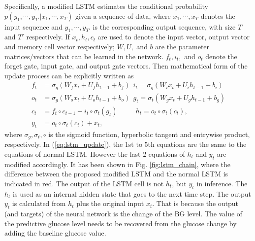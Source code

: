 \documentclass[a4paper, 10 pt, twocolumn]{IEEEtran}
\begin{document}
Specifically,  a modified LSTM estimates the conditional probability $p(y_1, \cdots,y_{T'}|x_1, \cdots,x_{T})$ given a sequence of data, where $x_1, \cdots,x_{T}$ denotes the input sequence and $y_1, \cdots,y_{T'}$ is the
corresponding output sequence, with size $T$ and $T'$ respectively. If $x_t, h_t, c_t$ are used to denote the input vector, output vector and memory cell vector respectively; $W, U,$ and $b$ are the parameter
matrices/vectors that can be learned in the network. $f_t, i_t,$ and $o_t$ denote the forget gate, input gate, and output gate vectors. Then mathematical form of the update process can be explicitly written as
\begin{equation}\label{eq:lstm_update}
\begin{split}
f_t &= \sigma_g(W_fx_t + U_fh_{t-1}+b_f) \ \ i_t = \sigma_g(W_ix_t + U_ih_{t-1}+ b_i)  \\
o_t &= \sigma_g(W_ox_t + U_oh_{t-1}+b_o)  \ \  g_t = \sigma_t(W_gx_t + U_gh_{t-1}+ b_g)  \\
c_t &= f_t \circ c_{t-1} + i_t \circ \sigma_t(g_t)  \ \ \ \ \ \ \ \ \ \ \ \  h_t = o_t \circ \sigma_t(c_t), \\
y_t &= o_t \circ \sigma_t(c_t) + x_t,
\end{split}
\end{equation}
where $\sigma_g, \sigma_t, \circ$ is the sigmoid function, hyperbolic tangent and entrywise product, respectively. In (\ref{eq:lstm_update}), the 1st to 5th equations are the same to the equations of normal LSTM. However
the last 2 equations of $h_t$ and $y_t$ are modified accordingly.
 It has been shown in Fig. \ref{fig:lstm_chain}, where the difference between the proposed modified LSTM and the normal LSTM is indicated in red. The output of the LSTM cell is not $h_t$, but $y_t$ in inference. The $h_t$
 is used as an internal hidden state that goes to the next time step. The output $y_t$ is calculated from $h_t$ plus the original input $x_t$. That is because the output (and targets) of the neural network is the change
 of the  {BG} level. The value of the predictive glucose level needs to be recovered from the glucose change by adding the baseline glucose value.
\end{document}
